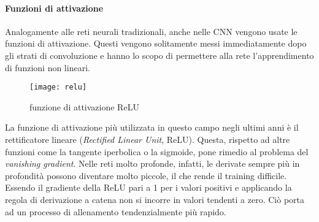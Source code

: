 \paragraph{Funzioni di attivazione}
Analogamente alle reti neurali tradizionali, anche nelle CNN vengono usate le funzioni di attivazione. Questi vengono solitamente messi immediatamente dopo gli strati di convoluzione e hanno lo scopo di permettere alla rete l'apprendimento di funzioni non lineari. 
\begin{figure}[ht]
    \centering
    \texttt{[image: relu]}
    \caption[Funzione di attivazione relu]{funzione di attivazione ReLU \cite{relu}}
\end{figure}
La funzione di attivazione più utilizzata in questo campo negli ultimi anni è il rettificatore lineare (\textit{Rectified Linear Unit}, ReLU). Questa, rispetto ad altre funzioni come la tangente iperbolica o la sigmoide, pone rimedio al problema del \textit{vanishing gradient}. Nelle reti molto profonde, infatti, le derivate sempre più in profondità possono diventare molto piccole, il che rende il training difficile. Essendo il gradiente della ReLU pari a 1 per i valori positivi e applicando la regola di derivazione a catena non si incorre in valori tendenti a zero. Ciò porta ad un processo di allenamento tendenzialmente più rapido.